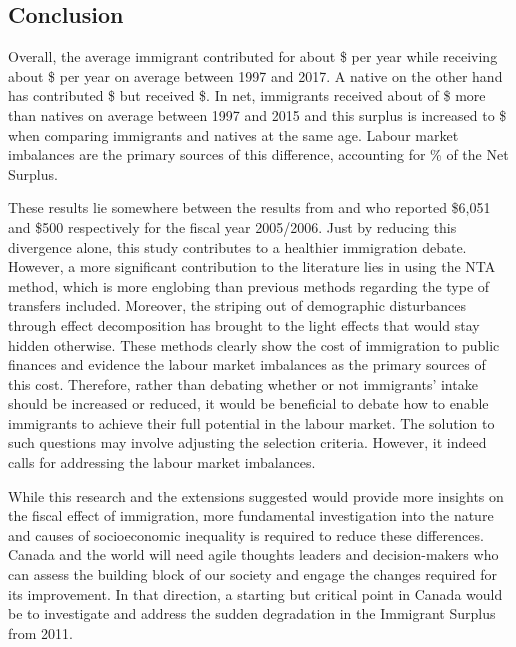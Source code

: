 \subsection{Conclusion}

Overall, the average immigrant contributed for about \$ per year while receiving about \$ per year on average between 1997 and 2017.
A native on the other hand has contributed \$ but received \$.
In net, immigrants received about of \$ more than natives on average between 1997 and 2015 and this surplus is increased to \$ when comparing immigrants and natives at the same age.
Labour market imbalances are the primary sources of this difference, accounting for \% of the Net Surplus.

\vspace{0.7em}\par
These results lie somewhere between the results from \citet{Grubel:2012wo} and \citet{Javdani:2013gu} who reported \$6,051 and \$500 respectively for the fiscal year 2005/2006.
Just by reducing this divergence alone, this study contributes to a healthier immigration debate. However, a more significant contribution to the literature lies in using the NTA method, which is more englobing than previous methods regarding the type of transfers included. Moreover, the striping out of demographic disturbances through effect decomposition has brought to the light effects that would stay hidden otherwise.
These methods clearly show the cost of immigration to public finances and evidence the labour market imbalances as the primary sources of this cost.
Therefore, rather than debating whether or not immigrants' intake should be increased or reduced, it would be beneficial to debate how to enable immigrants to achieve their full potential in the labour market.
The solution to such questions may involve adjusting the selection criteria. However, it indeed calls for addressing the labour market imbalances.

\vspace{0.7em}\par
While this research and the extensions suggested would provide more insights on the fiscal effect of immigration, more fundamental investigation into the nature and causes of socioeconomic inequality is required to reduce these differences.
Canada and the world will need agile thoughts leaders and decision-makers who can assess the building block of our society and engage the changes required for its improvement.
In that direction, a starting but critical point in Canada would be to investigate and address the sudden degradation in the Immigrant Surplus from 2011.